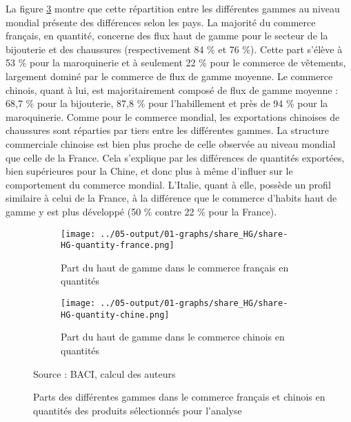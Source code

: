 \documentclass[french,10pt,a4paper]{article}
\begin{document}
\bigskip

La figure \ref{fig:share-HG-quantity-france-chine} montre que cette répartition entre les différentes gammes au niveau mondial présente des différences selon les pays. La majorité du commerce français, en quantité, concerne des flux haut de gamme pour le secteur de la bijouterie et des chaussures (respectivement 84 \% et 76 \%). Cette part s'élève à 53 \% pour la maroquinerie et à seulement 22 \% pour le commerce de vêtements, largement dominé par le commerce de flux de gamme moyenne. Le commerce chinois, quant à lui, est majoritairement composé de flux de gamme moyenne : 68,7 \% pour la bijouterie, 87,8 \% pour l'habillement et près de 94 \% pour la maroquinerie. Comme pour le commerce mondial, les exportations chinoises de chaussures sont réparties par tiers entre les différentes gammes. La structure commerciale chinoise est bien plus proche de celle observée au niveau mondial que celle de la France. Cela s'explique par les différences de quantités exportées, bien supérieures pour la Chine, et donc plus à même d'influer sur le comportement du commerce mondial. L'Italie, quant à elle, possède un profil similaire à celui de la France, à la différence que le commerce d'habits haut de gamme y est plus développé (50 \% contre 22 \% pour la France).


\begin{figure}[!h]
  \centering
  \begin{subfigure}{\textwidth}
    \centering    
    \texttt{[image: ../05-output/01-graphs/share\_HG/share-HG-quantity-france.png]}
    \caption{Part du haut de gamme dans le commerce français en quantités}
    \label{fig:share-HG-quantity-france}
  \end{subfigure}
  \vspace{0.5cm}
  \begin{subfigure}{\textwidth}
    \centering
 \texttt{[image: ../05-output/01-graphs/share\_HG/share-HG-quantity-chine.png]}
 \caption{Part du haut de gamme dans le commerce chinois en quantités}
 \label{fig:share-HG-quantity-chine}
\end{subfigure}
\captionsetup{justification=raggedright,singlelinecheck=false, font=small}
  \caption*{Source : BACI, calcul des auteurs}
  \captionsetup{justification=centering, singlelinecheck=true, font=normalsize}
  \caption{Parts des différentes gammes dans le commerce français et chinois en quantités des produits sélectionnés pour l'analyse}
  \label{fig:share-HG-quantity-france-chine}
\end{figure}
\end{document}
